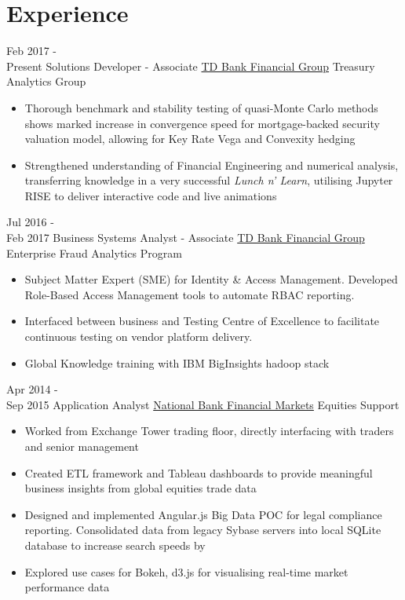 \documentclass[letterpaper]{twentysecondcv} %
\begin{document}
\section{Experience}

\begin{twenty} %
	\twentyitem
    	{Feb 2017 - \\ Present}
        {Solutions Developer - Associate}
        {\href{http://www.td.com/}{TD Bank Financial Group}}
        {Treasury Analytics Group}
        {
        {\begin{itemize}
        \item Thorough benchmark and stability testing of quasi-Monte Carlo methods shows marked increase in convergence speed for mortgage-backed security valuation model, allowing for Key Rate Vega and Convexity hedging
        \item Strengthened understanding of Financial Engineering and numerical analysis, transferring knowledge in a very successful \emph{Lunch n' Learn}, utilising Jupyter RISE to deliver interactive code and live animations
    \end{itemize}}
        }
        
    \twentyitem
   		{Jul 2016 - \\
   		Feb 2017}
        {Business Systems Analyst - Associate}
        {\href{http://www.td.com/}{TD Bank Financial Group}}
        {Enterprise Fraud Analytics Program}
        {
        {\begin{itemize}
        \item Subject Matter Expert (SME) for Identity \& Access Management. Developed Role-Based Access Management tools to automate RBAC reporting.
        \item Interfaced between business and Testing Centre of Excellence to facilitate continuous testing on vendor platform delivery.
        \item Global Knowledge training with IBM BigInsights hadoop stack
    \end{itemize}}
        }
        
     \twentyitem
   		{Apr 2014 - \\ Sep 2015}
        {Application Analyst}
        {\href{http://nbfm.ca/}{National Bank Financial Markets}}
        {Equities Support}
        {
        \begin{itemize}
		\item Worked from Exchange Tower trading floor, directly interfacing with traders and senior management        
        \item Created ETL framework and Tableau dashboards to provide meaningful business insights from global equities trade data
        \item Designed and implemented Angular.js Big Data POC for legal compliance reporting. Consolidated data from legacy Sybase servers into local SQLite database to increase search speeds by 
        \item Explored use cases for Bokeh, d3.js for visualising real-time market performance data
	    \end{itemize}
    	}
        
\end{twenty}
\end{document}
